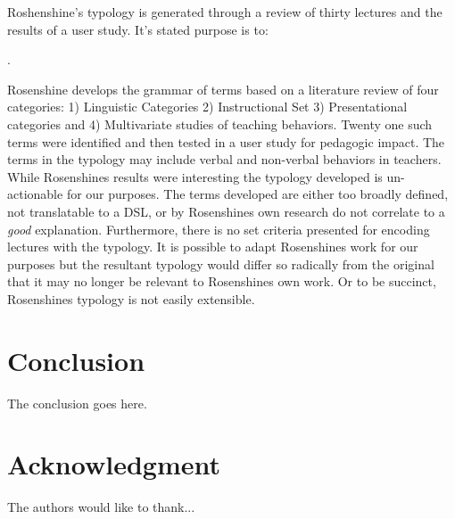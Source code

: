 \documentclass[conference]{IEEEtran}
\begin{document}
Roshenshine's\cite{rosenshine1968objectively} typology is generated through a
review of thirty lectures and the results of a user study. It's stated purpose
is to:

. 

Rosenshine develops the grammar of terms based on a literature review of four
categories: 1) Linguistic Categories 2) Instructional Set 3) Presentational
categories and 4) Multivariate studies of teaching behaviors. Twenty one such
terms were identified and then tested in a user study for pedagogic impact. The
terms in the typology may include verbal and non-verbal behaviors in teachers.
While Rosenshines results were interesting the typology developed is
un-actionable for our purposes. The terms developed are either too broadly
defined, not translatable to a DSL, or by Rosenshines own research do not
correlate to a \emph{good} explanation. Furthermore, there is no set criteria
presented for encoding lectures with the typology. It is possible to adapt
Rosenshines work for our purposes but the resultant typology would differ so
radically from the original that it may no longer be relevant to Rosenshines own
work. Or to be succinct, Rosenshines typology is not easily extensible.

\section{Conclusion}

The conclusion goes here.


\section*{Acknowledgment}

The authors would like to thank...



\end{document}

